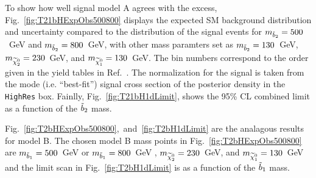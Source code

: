 To show how well signal model A agrees with the excess,
Fig.~\ref{fig:T21bHExpObs500800} displays the expected SM background
distribution and uncertainty compared to the distribution of the
signal events for $m_{\tilde{b}_2}=500$~GeV and
$m_{\tilde{b}_2}=800$~GeV, with other mass paramters set as
$m_{\tilde{b}_2}=130$~GeV, $m_{\widetilde{\chi}^{0}_2}=230$~GeV, and
$m_{\widetilde{\chi}^{0}_1}=130$~GeV. The bin numbers correspond to the order given
in the yield tables in Ref.~\cite{RazorHgaga}. %
The normalization for the signal is
taken from the mode (i.e. ``best-fit'') signal cross section of the posterior density in the
\texttt{HighRes} box. Fainlly, Fig.~\ref{fig:T21bH1dLimit}, shows the
95\% CL combined limit as a function of the $\tilde{b}_2$ mass.


Fig.~\ref{fig:T2bHExpObs500800},~and~\ref{fig:T2bH1dLimit} are
the analagous results for model B. The chosen model B mass points in Fig.~\ref{fig:T2bHExpObs500800} are
$m_{\tilde{b}_1}=500$~GeV or $m_{\tilde{b}_1}=800$~GeV , $m_{\widetilde{\chi}^{0}_2}=230$~GeV, and
$m_{\widetilde{\chi}^{0}_1}=130$~GeV and the limit scan in Fig.~\ref{fig:T2bH1dLimit} is as a function of the $\tilde{b}_1$ mass.

